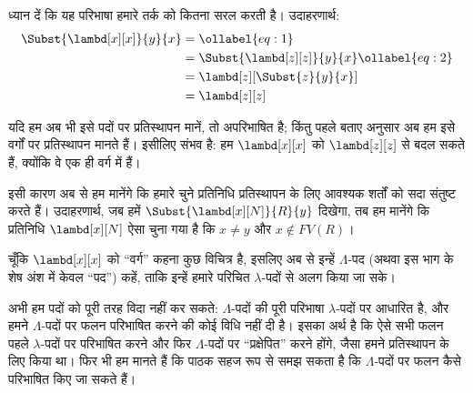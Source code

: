 \documentclass[../../../include/open-logic-section]{subfiles}
\begin{document}
ध्यान दें कि यह परिभाषा हमारे तर्क को कितना सरल करती है। उदाहरणार्थ:
\begin{align}
  \Subst{\lambd[x][x]}{y}{x} & =\ollabel{eq:1}\\
  &= \Subst{\lambd[z][z]}{y}{x} \ollabel{eq:2}\\
  &= \lambd[z][\Subst{z}{y}{x}] \\
  &= \lambd[z][z]
\end{align}

यदि हम अब भी इसे पदों पर प्रतिस्थापन मानें, तो  अपरिभाषित है;
किंतु पहले बताए अनुसार अब हम इसे वर्गों पर प्रतिस्थापन मानते हैं। इसीलिए
 संभव है: हम $\lambd[x][x]$ को $\lambd[z][z]$ से बदल सकते हैं,
क्योंकि वे एक ही वर्ग में हैं।

इसी कारण अब से हम मानेंगे कि हमारे चुने प्रतिनिधि प्रतिस्थापन के लिए
आवश्यक शर्तों को सदा संतुष्ट करते हैं। उदाहरणार्थ, जब हमें
$\Subst{\lambd[x][N]}{R}{y}$ दिखेगा, तब हम मानेंगे कि प्रतिनिधि
$\lambd[x][N]$ ऐसा चुना गया है कि $x \neq y$ और $x \notin FV(R)$।

चूँकि $\lambd[x][x]$ को ``वर्ग'' कहना कुछ विचित्र है, इसलिए अब से इन्हें
$\Lambda$-पद (अथवा इस भाग के शेष अंश में केवल ``पद'') कहें, ताकि इन्हें
हमारे परिचित $\lambda$-पदों से अलग किया जा सके।

\begin{editorial}
  अभी हम पदों को पूरी तरह विदा नहीं कर सकते: $\Lambda$-पदों की पूरी
  परिभाषा $\lambda$-पदों पर आधारित है, और हमने $\Lambda$-पदों पर फलन
  परिभाषित करने की कोई विधि नहीं दी है। इसका अर्थ है कि ऐसे सभी फलन पहले
  $\lambda$-पदों पर परिभाषित करने और फिर $\Lambda$-पदों पर ``प्रक्षेपित''
  करने होंगे, जैसा हमने प्रतिस्थापन के लिए किया था। फिर भी हम मानते हैं कि
  पाठक सहज रूप से समझ सकता है कि $\Lambda$-पदों पर फलन कैसे परिभाषित किए
  जा सकते हैं।
\end{editorial}
\end{document}
